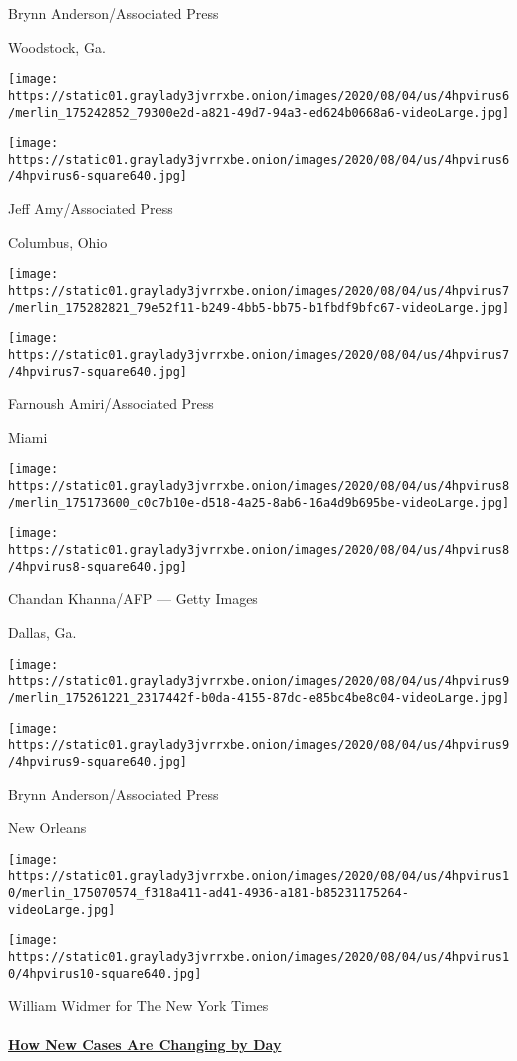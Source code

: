 Brynn Anderson/Associated Press

Woodstock, Ga.

\texttt{[image: https://static01.graylady3jvrrxbe.onion/images/2020/08/04/us/4hpvirus6/merlin\_175242852\_79300e2d-a821-49d7-94a3-ed624b0668a6-videoLarge.jpg]}

\texttt{[image: https://static01.graylady3jvrrxbe.onion/images/2020/08/04/us/4hpvirus6/4hpvirus6-square640.jpg]}

 Jeff Amy/Associated Press

Columbus, Ohio

\texttt{[image: https://static01.graylady3jvrrxbe.onion/images/2020/08/04/us/4hpvirus7/merlin\_175282821\_79e52f11-b249-4bb5-bb75-b1fbdf9bfc67-videoLarge.jpg]}

\texttt{[image: https://static01.graylady3jvrrxbe.onion/images/2020/08/04/us/4hpvirus7/4hpvirus7-square640.jpg]}

 Farnoush Amiri/Associated Press

Miami

\texttt{[image: https://static01.graylady3jvrrxbe.onion/images/2020/08/04/us/4hpvirus8/merlin\_175173600\_c0c7b10e-d518-4a25-8ab6-16a4d9b695be-videoLarge.jpg]}

\texttt{[image: https://static01.graylady3jvrrxbe.onion/images/2020/08/04/us/4hpvirus8/4hpvirus8-square640.jpg]}

 Chandan Khanna/AFP --- Getty Images

Dallas, Ga.

\texttt{[image: https://static01.graylady3jvrrxbe.onion/images/2020/08/04/us/4hpvirus9/merlin\_175261221\_2317442f-b0da-4155-87dc-e85bc4be8c04-videoLarge.jpg]}

\texttt{[image: https://static01.graylady3jvrrxbe.onion/images/2020/08/04/us/4hpvirus9/4hpvirus9-square640.jpg]}

 Brynn Anderson/Associated Press

New Orleans

\texttt{[image: https://static01.graylady3jvrrxbe.onion/images/2020/08/04/us/4hpvirus10/merlin\_175070574\_f318a411-ad41-4936-a181-b85231175264-videoLarge.jpg]}

\texttt{[image: https://static01.graylady3jvrrxbe.onion/images/2020/08/04/us/4hpvirus10/4hpvirus10-square640.jpg]}

 William Widmer for The New York Times

\hypertarget{how-new-cases-are-changing-by-day}{%
\paragraph{\texorpdfstring{\href{https://www.nytimes3xbfgragh.onion/interactive/2020/world/coronavirus-maps.html}{How
New Cases Are Changing by
Day}}{How New Cases Are Changing by Day}}\label{how-new-cases-are-changing-by-day}}

